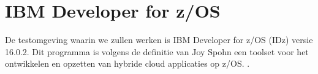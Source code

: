 \section{IBM Developer for z/OS}
\label{sec:IBM Developer for z/OS (IDz)}
De testomgeving waarin we zullen werken is IBM Developer for z/OS (IDz) versie 16.0.2. Dit programma is volgens de definitie van Joy Spohn een toolset voor het ontwikkelen en opzetten van hybride cloud applicaties op z/OS. \textcite{Spohn2023}. 